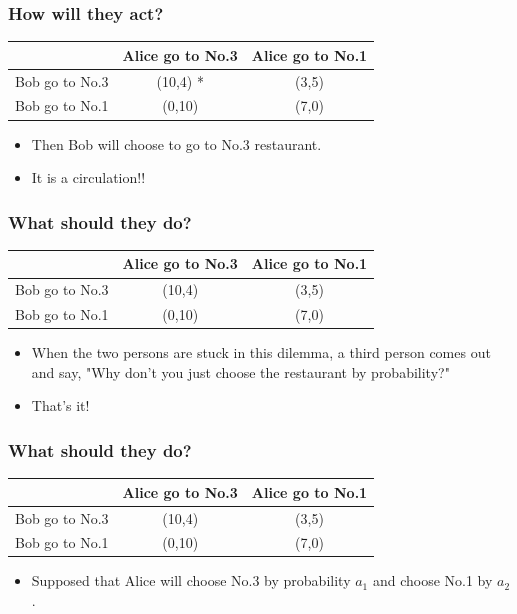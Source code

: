 \documentclass{beamer}
\begin{document}
\begin{frame}
\frametitle{How will they act?}
\begin{tabular}{|c|c|c|}
\hline
\hline
    & {\color{red}Alice} go to No.3 & {\color{red}Alice} go to No.1\\
\hline
{\color{blue}Bob} go to No.3 & ({\color{blue}10},{\color{red}4}) {\color{green}*}& ({\color{blue}3},{\color{red}5})\\
\hline
{\color{blue}Bob} go to No.1 & ({\color{blue}0},{\color{red}10}) & ({\color{blue}7},{\color{red}0})\\
\hline
\hline
\end{tabular}
\begin{itemize}
\item Then {\color{blue}Bob} will choose to go to No.3 restaurant.
\item {\Large It is a circulation!!}
\end{itemize}
\end{frame}

\begin{frame}
\frametitle{What should they do?}
\begin{tabular}{|c|c|c|}
\hline
\hline
    & {\color{red}Alice} go to No.3 & {\color{red}Alice} go to No.1\\
\hline
{\color{blue}Bob} go to No.3 & ({\color{blue}10},{\color{red}4}) & ({\color{blue}3},{\color{red}5})\\
\hline
{\color{blue}Bob} go to No.1 & ({\color{blue}0},{\color{red}10}) & ({\color{blue}7},{\color{red}0})\\
\hline
\hline
\end{tabular}
\begin{itemize}
\item When the two persons are stuck in this dilemma, a third person comes out and say, {\Large "Why don't you just choose the restaurant by probability?}"
\item That's it!
\end{itemize}
\end{frame}

\begin{frame}
\frametitle{What should they do?}
\begin{tabular}{|c|c|c|}
\hline
\hline
    & {\color{red}Alice} go to No.3 & {\color{red}Alice} go to No.1\\
\hline
{\color{blue}Bob} go to No.3 & ({\color{blue}10},{\color{red}4}) & ({\color{blue}3},{\color{red}5})\\
\hline
{\color{blue}Bob} go to No.1 & ({\color{blue}0},{\color{red}10}) & ({\color{blue}7},{\color{red}0})\\
\hline
\hline
\end{tabular}
\begin{itemize}
\item Supposed that Alice will choose No.3 by probability $a_1$ and choose No.1 by $a_2$.
\end{itemize}
\end{frame}
\end{document}

